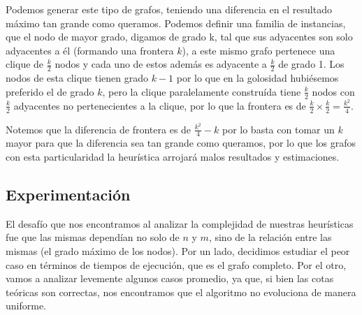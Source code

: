 Podemos generar este tipo de grafos, teniendo una diferencia en el resultado máximo tan grande como queramos. Podemos definir una familia de instancias, que el nodo de mayor grado, digamos de grado k, tal que sus adyacentes son solo adyacentes a él (formando una frontera $k$), a este mismo grafo pertenece una clique de $\frac{k}{2}$ nodos y cada uno de estos además es adyacente a $\frac{k}{2}$ de grado 1. Los nodos de esta clique tienen grado $k - 1$ por lo que en la golosidad hubiésemos preferido el de grado $k$, pero la clique paralelamente construída tiene $\frac{k}{2}$ nodos con $\frac{k}{2}$ adyacentes no pertenecientes a la clique, por lo que la frontera es de $\frac{k}{2} \times \frac{k}{2} = \frac{k^2}{4}$.

Notemos que la diferencia de frontera es de $\frac{k^2}{4} - k$ por lo basta con tomar un $k$ mayor para que la diferencia sea tan grande como queramos, por lo que los grafos con esta particularidad la heurística arrojará malos resultados y estimaciones.

\subsection{Experimentación}

El desafío que nos encontramos al analizar la complejidad de nuestras heurísticas fue que las mismas dependían no solo de $n$ y $m$, sino de la relación entre las mismas (el grado máximo de los nodos). Por un lado, decidimos estudiar el peor caso en términos de tiempos de ejecución, que es el grafo completo. Por el otro, vamos a analizar levemente algunos casos promedio, ya que, si bien las cotas teóricas son correctas, nos encontramos que el algoritmo no evoluciona de manera uniforme.

